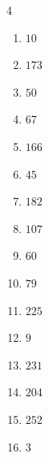 \begin{multicols}{4}
\begin{enumerate}
  \item $10$


  \item $173$


  \item $50$


  \item $67$


  \item $166$


  \item $45$


  \item $182$


  \item $107$


  \item $60$


  \item $79$


  \item $225$


  \item $9$


  \item $231$


\columnbreak %

  \item $204$


  \item $252$


  \item $3$


\end{enumerate}
\end{multicols}
